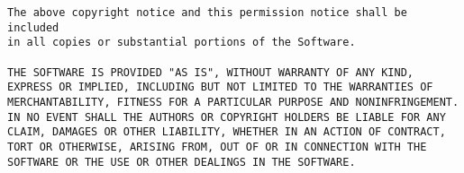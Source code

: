 \begin{verbatim}
The above copyright notice and this permission notice shall be included
in all copies or substantial portions of the Software.
 
THE SOFTWARE IS PROVIDED "AS IS", WITHOUT WARRANTY OF ANY KIND,
EXPRESS OR IMPLIED, INCLUDING BUT NOT LIMITED TO THE WARRANTIES OF
MERCHANTABILITY, FITNESS FOR A PARTICULAR PURPOSE AND NONINFRINGEMENT.
IN NO EVENT SHALL THE AUTHORS OR COPYRIGHT HOLDERS BE LIABLE FOR ANY
CLAIM, DAMAGES OR OTHER LIABILITY, WHETHER IN AN ACTION OF CONTRACT,
TORT OR OTHERWISE, ARISING FROM, OUT OF OR IN CONNECTION WITH THE
SOFTWARE OR THE USE OR OTHER DEALINGS IN THE SOFTWARE.
\end{verbatim}
